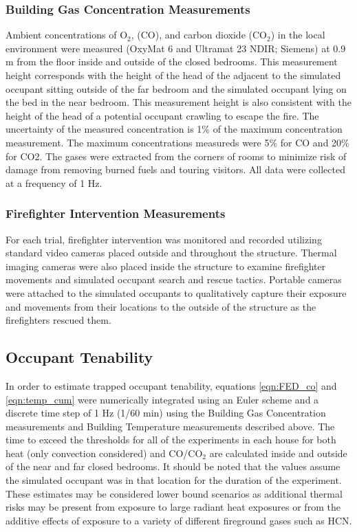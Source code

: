\documentclass[12pt,oneside]{article}
\begin{document}
\subsubsection{Building Gas Concentration Measurements}
Ambient concentrations of O$_2$, (CO), and carbon dioxide (CO$_2$) in the local environment were measured (OxyMat 6 and Ultramat 23 NDIR; Siemens) at 0.9 m from the floor inside and outside of the closed bedrooms.   This measurement height corresponds with the height of the head of the adjacent to the simulated occupant sitting outside of the far bedroom and the simulated occupant lying on the bed in the near bedroom.  This measurement height is also consistent with the height of the head of a potential occupant crawling to escape the fire.  The uncertainty of the measured concentration is 1\% of the maximum concentration measurement. The maximum concentrations measureds were 5\% for CO and 20\% for CO2. The gases were extracted from the corners of rooms  to minimize risk of damage from removing burned fuels and touring visitors. All data were collected at a frequency of 1 Hz. 

\subsubsection{Firefighter Intervention Measurements}
For each trial, firefighter intervention was monitored and recorded utilizing standard video cameras placed outside and throughout the structure.  Thermal imaging cameras were also placed inside the structure to examine firefighter movements and simulated occupant search and rescue tactics.  Portable cameras were attached to the simulated occupants to qualitatively capture their exposure and movements from their locations to the outside of the structure as the firefighters rescued them.

\subsection{Occupant Tenability}

In order to estimate trapped occupant tenability, equations \ref{eqn:FED_co} and \ref{eqn:temp_cum}  were numerically integrated using an Euler scheme and a discrete time step of 1 Hz (1/60 min) using the Building Gas Concentration measurements and Building Temperature measurements described above. The time to exceed the thresholds for all of the experiments in each house for both heat (only convection considered) and CO/CO$_2$ are calculated inside and outside of the near and far closed bedrooms.  It should be noted that the values assume the simulated occupant was in that location for the duration of the experiment. These estimates may be considered lower bound scenarios as additional thermal risks may be present from exposure to large radiant heat exposures or from the additive effects of exposure to a variety of different fireground gases such as HCN.
\end{document}
